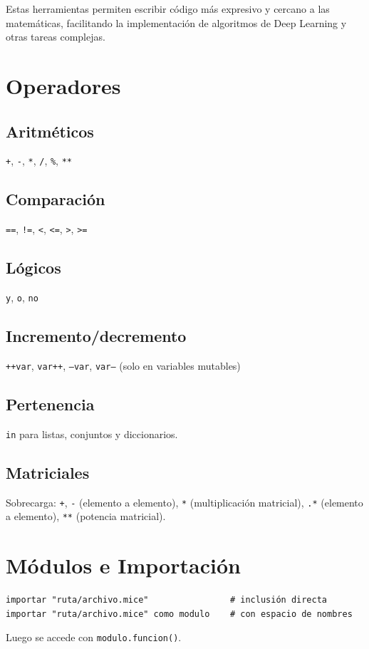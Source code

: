 \documentclass[12pt]{article}
\begin{document}
Estas herramientas permiten escribir código más expresivo y cercano a las matemáticas, facilitando la implementación de algoritmos de Deep Learning y otras tareas complejas.
\section{Operadores}

\subsection{Aritméticos}
\texttt{+}, \texttt{-}, \texttt{*}, \texttt{/}, \texttt{\%}, \texttt{**}

\subsection{Comparación}
\texttt{==}, \texttt{!=}, \texttt{<}, \texttt{<=}, \texttt{>}, \texttt{>=}

\subsection{Lógicos}
\texttt{y}, \texttt{o}, \texttt{no}

\subsection{Incremento/decremento}
\texttt{++var}, \texttt{var++}, \texttt{--var}, \texttt{var--} (solo en variables mutables)

\subsection{Pertenencia}
\texttt{in} para listas, conjuntos y diccionarios.

\subsection{Matriciales}
Sobrecarga: \texttt{+}, \texttt{-} (elemento a elemento), \texttt{*} (multiplicación matricial), \texttt{.*} (elemento a elemento), \texttt{**} (potencia matricial).

\section{Módulos e Importación}

\begin{lstlisting}
importar "ruta/archivo.mice"                # inclusión directa
importar "ruta/archivo.mice" como modulo    # con espacio de nombres
\end{lstlisting}
Luego se accede con \texttt{modulo.funcion()}.
\end{document}
